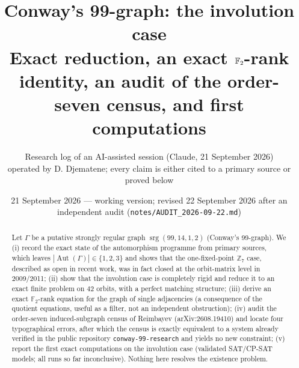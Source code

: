 \documentclass[11pt,a4paper]{article}
\title{Conway's 99-graph: the involution case\\
\large Exact reduction, an exact $\F_2$-rank identity, an audit of the order-seven census, and first computations}
\author{Research log of an AI-assisted session (Claude, 21 September 2026)\\ \small operated by D. Djematene; every claim is either cited to a primary source or proved below}
\date{21 September 2026 --- working version; revised 22 September 2026 after an independent audit (\texttt{notes/AUDIT\_2026-09-22.md})}
\theoremstyle{remark}
\newcommand{\F}{\mathbb{F}}
\newcommand{\Z}{\mathbb{Z}}
\newcommand{\srg}{\operatorname{srg}}
\begin{document}
\maketitle

\begin{abstract}
Let $\Gamma$ be a putative strongly regular graph $\srg(99,14,1,2)$ (Conway's 99-graph). We (i) record the exact state of the automorphism
programme from primary sources, which leaves $|\!\operatorname{Aut}(\Gamma)|\in\{1,2,3\}$ and shows that the one-fixed-point $\Z_7$ case, described
as open in recent work, was in fact closed at the orbit-matrix level in 2009/2011; (ii) show that the involution case is completely rigid and reduce it
to an exact finite problem on $42$ orbits, with a perfect matching structure; (iii) derive an exact $\F_2$-rank equation for the graph of single adjacencies (a consequence of the quotient
equations, useful as a filter, not an independent obstruction); (iv) audit the order-seven
induced-subgraph census of Reimbayev (arXiv:2608.19410) and locate four typographical errors, after which the census is exactly equivalent to a
system already verified in the public repository \texttt{conway-99-research} and yields no new constraint; (v) report the first exact computations on
the involution case (validated SAT/CP-SAT models; all runs so far inconclusive). Nothing here resolves the existence problem.
\end{abstract}
\end{document}
